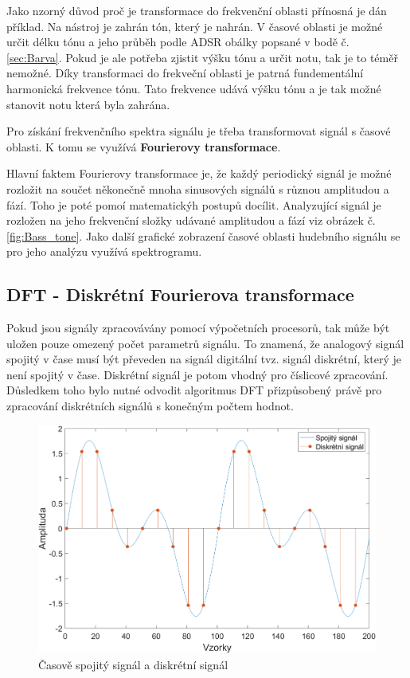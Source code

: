  Jako nzorný důvod proč je transformace do frekvenční oblasti přínosná je dán příklad. Na nástroj je zahrán tón, který je nahrán. 
  V časové oblasti je možné určit délku tónu a jeho průběh podle ADSR obálky popsané v bodě č. \ref*{sec:Barva}.
  Pokud je ale potřeba zjistit výšku tónu a určit notu, tak je to téměř nemožné.
  Díky transformaci do frekveční oblasti je patrná fundementální harmonická frekvence tónu.
  Tato frekvence udává výšku tónu a je tak možné stanovit notu která byla zahrána.

  Pro získání frekvenčního spektra signálu je třeba transformovat signál s časové oblasti.
  K tomu se využívá \textbf{Fourierovy transformace}. 

  Hlavní faktem Fourierovy transformace je, že každý periodický signál je možné rozložit na součet někonečně mnoha sinusových signálů s různou amplitudou a fází.
  Toho je poté pomoí matematickýh postupů docílit.
  Analyzující signál je rozložen na jeho frekvenční složky udávané amplitudou a fází viz obrázek č.\ref*{fig:Bass_tone}.
  Jako další grafické zobrazení časové oblasti hudebního signálu se pro jeho analýzu využívá spektrogramu.


  \subsection{DFT - Diskrétní Fourierova transformace}

  Pokud jsou signály zpracovávány pomocí výpočetních procesorů,
  tak může být uložen pouze omezený počet parametrů signálu.
  To znamená, že analogový signál spojitý v čase musí být převeden na signál digitální tvz. signál diskrétní, který je není spojitý v čase. 
  Diskrétní signál je potom vhodný pro číslicové zpracování.
  Důsledkem toho bylo nutné odvodit algoritmus \acs{DFT} přizpůsobený právě pro zpracování diskrétních signálů s konečným počtem hodnot.

  \begin{figure}[H]
    \centering
    \includegraphics[width = 0.8\linewidth]{obrazky/Discrete_signal.png}
    \caption{Časově spojitý signál a diskrétní signál}
    \label{fig:Discrete_signal}
  \end{figure}

